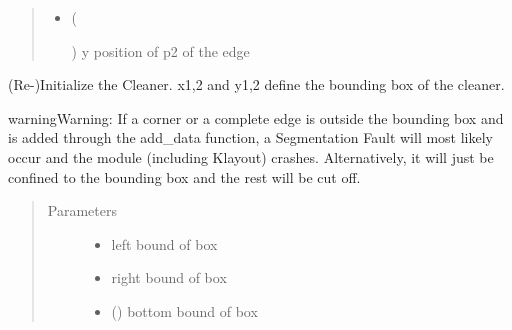 \documentclass[a4paper,10pt,english]{sphinxmanual}
\begin{document}
\begin{fulllineitems}
\begin{fulllineitems}
\begin{quote}
\begin{description}
\begin{itemize}
\item {} 
 (%
\begin{footnote}[9]\sphinxAtStartFootnote
{}
%
\end{footnote}) \textendash{} y position of p2 of the edge

\end{itemize}

\end{description}\end{quote}

\end{fulllineitems}


\begin{fulllineitems}
\label{\detokenize{drc:drc.drc.slcleaner.PyDrcSl.init_list}}
(Re-)Initialize the Cleaner. x1,2 and y1,2 define the bounding box of the cleaner.

\begin{sphinxadmonition}{warning}{Warning:}
If a corner or a complete edge is outside the bounding box and is added through the add\_data function, a Segmentation Fault will most likely occur and the module (including Klayout) crashes. Alternatively, it will just be confined to the bounding box and the rest will be cut off.
\end{sphinxadmonition}
\begin{quote}\begin{description}
\item[{Parameters}] \leavevmode\begin{itemize}
\item {} 
 \textendash{} left bound of box

\item {} 
 \textendash{} right bound of box

\item {} 
 () \textendash{} bottom bound of box


\end{itemize}
\end{description}
\end{quote}
\end{fulllineitems}
\end{fulllineitems}
\end{document}
